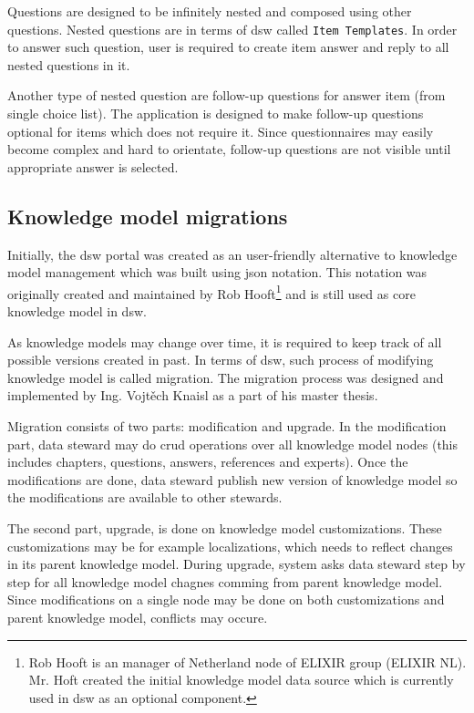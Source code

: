 Questions are designed to be infinitely nested and composed using other questions.
Nested questions are in terms of \gls{dsw} called \texttt{Item Templates}.
In order to answer such question, user is required to create item answer and reply to all nested questions in it.

Another type of nested question are follow-up questions for answer item (from single choice list).
The application is designed to make follow-up questions optional for items which does not require it.
Since questionnaires may easily become complex and hard to orientate, follow-up questions are not visible until appropriate answer is selected.


\subsection{Knowledge model migrations}\label{sec:km-migrations}

Initially, the \gls{dsw} portal was created as an user-friendly alternative to knowledge model management which was built using \gls{json} notation.
This notation was originally created and maintained by Rob Hooft\footnote{Rob Hooft is an manager of Netherland node of ELIXIR group (ELIXIR NL). Mr. Hoft created the initial knowledge model data source which is currently used in \gls{dsw} as an optional component.} and is still used as core knowledge model in \gls{dsw}.

As knowledge models may change over time, it is required to keep track of all possible versions created in past.
In terms of \gls{dsw}, such process of modifying knowledge model is called migration.
The migration process was designed and implemented by Ing. Vojtěch Knaisl as a part of his master thesis\cite{mt-knaisl}.

Migration consists of two parts: modification and upgrade.
In the modification part, data steward may do \gls{crud} operations over all knowledge model nodes (this includes chapters, questions, answers, references and experts).
Once the modifications are done, data steward publish new version of knowledge model so the modifications are available to other stewards.

The second part, upgrade, is done on knowledge model customizations.
These customizations may be for example localizations, which needs to reflect changes in its parent knowledge model.
During upgrade, system asks data steward step by step for all knowledge model chagnes comming from parent knowledge model.
Since modifications on a single node may be done on both customizations and parent knowledge model, conflicts may occure.

